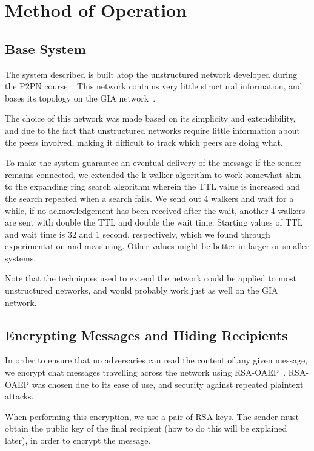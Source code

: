 \section{Method of Operation}

\subsection{Base System}
\label{subsec:base_system}

The system described is built atop the unstructured network developed during the P2PN course~\citep{P2PN}. This network contains very little structural information, and bases its topology on the GIA network~\citep{GIA}.

The choice of this network was made based on its simplicity and extendibility, and due to the fact that unstructured networks require little information about the peers involved, making it difficult to track which peers are doing what. 

To make the system guarantee an eventual delivery of the message if the sender remains connected, we extended the k-walker algorithm to work somewhat akin to the expanding ring search algorithm wherein the TTL value is increased and the search repeated when a search fails. We send out 4 walkers and wait for a while, if no acknowledgement has been received after the wait, another 4 walkers are sent with double the TTL and double the wait time. Starting values of TTL and wait time is 32 and 1 second, respectively, which we found through experimentation and measuring. Other values might be better in larger or smaller systems.

Note that the techniques used to extend the network could be applied to most unstructured networks, and would probably work just as well on the GIA network.

\subsection{Encrypting Messages and Hiding Recipients}

In order to ensure that no adversaries can read the content of any given message, we encrypt chat messages travelling across the network using RSA-OAEP~\citep{OAEP}. RSA-OAEP was chosen due to its ease of use, and security against repeated plaintext attacks.

When performing this encryption, we use a pair of RSA keys. The sender must obtain the public key of the final recipient (how to do this will be explained later), in order to encrypt the message.


